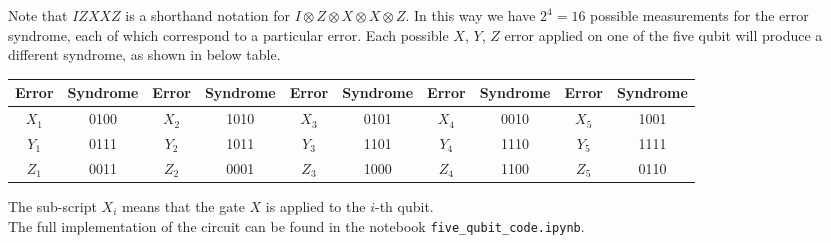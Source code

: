 \documentclass{article}
\begin{document}
 	\noindent Note that $IZXXZ$ is a shorthand notation for $I\otimes Z\otimes X\otimes X\otimes Z$. In this way we have $2^4 = 16$ possible measurements for the error syndrome, each of which correspond to a particular error. Each possible $X$, $Y$, $Z$ error applied on one of the five qubit will produce a different syndrome, as shown in below table. 
 	\begin{table}[H]
 		\centering
 		\begin{tabular}{|c|c|c|c|c|c|c|c|c|c|}
 			\hline
 			Error & Syndrome & Error & Syndrome & Error & Syndrome & Error & Syndrome & Error & Syndrome \\ \hline
 			$X_1$  & 0100 & $X_2$  & 1010 & $X_3$  & 0101 & $X_4$ & 0010 & $X_5$ & 1001 \\ \hline
 			$Y_1$  & 0111 & $Y_2$  & 1011 & $Y_3$  & 1101 & $Y_4$ & 1110 & $Y_5$ & 1111 \\ \hline
 			$Z_1$  & 0011 & $Z_2$  & 0001 & $Z_3$  & 1000 & $Z_4$ & 1100 & $Z_5$ & 0110 \\ \hline
 		\end{tabular}
 	\end{table}
 	\noindent The sub-script $X_i$ means that the gate $X$ is applied to the $i$-th qubit.\\
 	The full implementation of the circuit can be found in the notebook \verb|five_qubit_code.ipynb|.
	 
	\newpage
	
	
\end{document}
